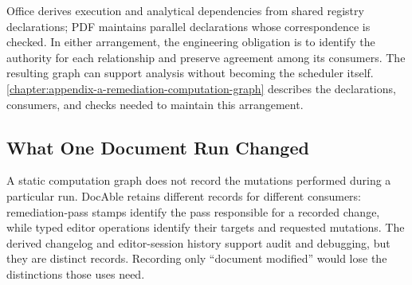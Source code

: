 
Office derives execution and analytical dependencies from shared registry declarations; PDF maintains parallel declarations whose correspondence is checked. In either arrangement, the engineering obligation is to identify the authority for each relationship and preserve agreement among its consumers. The resulting graph can support analysis without becoming the scheduler itself. \autoref{chapter:appendix-a-remediation-computation-graph} describes the declarations, consumers, and checks needed to maintain this arrangement.

\subsection{What One Document Run Changed}


A static computation graph does not record the mutations performed during a particular run. DocAble retains different records for different consumers: remediation-pass stamps identify the pass responsible for a recorded change, while typed editor operations identify their targets and requested mutations. The derived changelog and editor-session history support audit and debugging, but they are distinct records. Recording only ``document modified'' would lose the distinctions those uses need.


